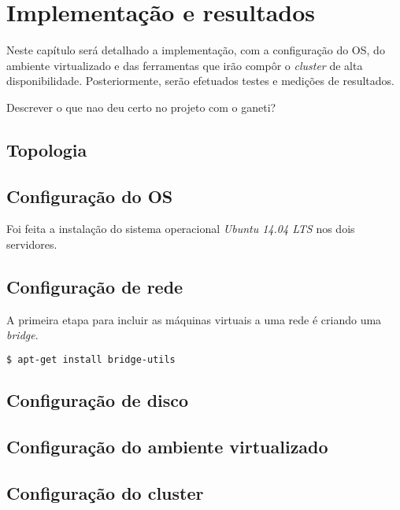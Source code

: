 \chapter{Implementação e resultados}
\label{cap:implementacaoresultados}

Neste capítulo será detalhado a implementação, com a configuração do \ac{OS}, do ambiente virtualizado e das ferramentas que irão compôr o
\textit{cluster} de alta disponibilidade. Posteriormente, serão efetuados testes e medições de resultados.

Descrever o que nao deu certo no projeto com o ganeti?

\section{Topologia}



\section{Configuração do \ac{OS}}

Foi feita a instalação do sistema operacional \textit{Ubuntu 14.04 \ac{LTS}} nos dois servidores.

\section{Configuração de rede}

A primeira etapa para incluir as máquinas virtuais a uma rede é criando uma \textit{bridge}. 

\begin{lstlisting}[language=bash]
  $ apt-get install bridge-utils
\end{lstlisting}

\section{Configuração de disco}


\section{Configuração do ambiente virtualizado}


\section{Configuração do cluster}

